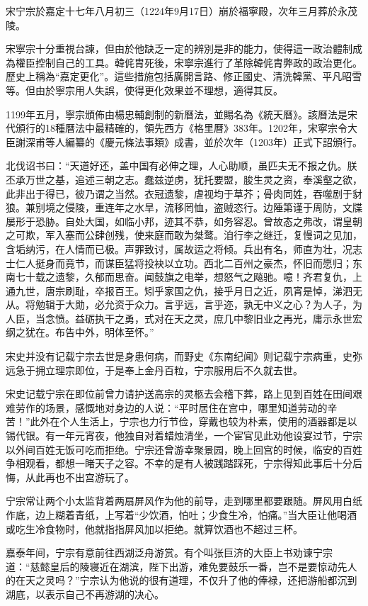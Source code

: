 宋宁宗於嘉定十七年八月初三（1224年9月17日）崩於福寧殿，次年三月葬於永茂陵。

宋寧宗十分重視台諫，但由於他缺乏一定的辨別是非的能力，使得這一政治體制成為權臣控制自己的工具。韓侂胄死後，宋寧宗進行了革除韓侂胄弊政的政治更化。歷史上稱為“嘉定更化”。這些措施包括廣開言路、修正國史、清洗韓黨、平凡昭雪等。但由於寧宗用人失誤，使得更化效果並不理想，適得其反。

1199年五月，寧宗頒佈由楊忠輔創制的新曆法，並賜名為《統天曆》。該曆法是宋代頒行的18種曆法中最精確的，領先西方《格里曆》383年。1202年，宋寧宗令大臣謝深甫等人編纂的《慶元條法事類》成書，並於次年（1203年）正式下詔頒行。

北伐诏书曰：“天道好还，盖中国有必伸之理，人心助顺，虽匹夫无不报之仇。朕丕承万世之基，追述三朝之志。蠢兹逆虏，犹托要盟，朘生灵之资，奉溪壑之欲，此非出于得已，彼乃谓之当然。衣冠遗黎，虐视均于草芥；骨肉同姓，吞噬剧于豺狼。兼别境之侵陵，重连年之水旱，流移罔恤，盗贼恣行。边陲第谨于周防，文牒屡形于恐胁。自处大国，如临小邦，迹其不恭，如务容忍。曾故态之弗改，谓皇朝之可欺，军入塞而公肆创残，使来庭而敢为桀鹜。洎行李之继迁，复慢词之见加，含垢纳污，在人情而已极。声罪致讨，属故运之将倾。兵出有名，师直为壮，况志士仁人挺身而竟节，而谋臣猛将投袂以立功。西北二百州之豪杰，怀旧而愿归；东南七十载之遗黎，久郁而思奋。闻鼓旗之电举，想怒气之飚驰。噫！齐君复仇，上通九世，唐宗刷耻，卒报百王。矧乎家国之仇，接乎月日之近，夙宵是悼，涕泗无从。将勉辑于大勋，必允资于众力。言乎远，言乎迩，孰无中义之心？为人子，为人臣，当念愤。益砺执干之勇，式对在天之灵，庶几中黎旧业之再光，庸示永世宏纲之犹在。布告中外，明体至怀。”

宋史并没有记载宁宗去世是身患何病，而野史《东南纪闻》则记载宁宗病重，史弥远急于拥立理宗即位，于是奉上金丹百粒，宁宗服用后不久就去世。

宋史记载宁宗在即位前曾力请护送高宗的灵柩去会稽下葬，路上见到百姓在田间艰难劳作的场景，感慨地对身边的人说：“平时居住在宫中，哪里知道劳动的辛苦！”此外在个人生活上，宁宗也力行节俭，穿戴也较为朴素，使用的酒器都是以锡代银。有一年元宵夜，他独自对着蜡烛清坐，一个宦官见此劝他设宴过节，宁宗以外间百姓无饭可吃而拒绝。宁宗还曾游幸聚景园，晚上回宫的时候，临安的百姓争相观看，都想一睹天子之容。不幸的是有人被践踏踩死，宁宗得知此事后十分后悔，从此再也不出宫游玩了。

宁宗常让两个小太监背着两扇屏风作为他的前导，走到哪里都要跟随。屏风用白纸作底，边上糊着青纸，上写着“少饮酒，怕吐；少食生冷，怕痛。”当大臣让他喝酒或吃生冷食物时，他就指指屏风加以拒绝。就算饮酒也不超过三杯。

嘉泰年间，宁宗有意前往西湖泛舟游赏。有个叫张巨济的大臣上书劝谏宁宗道：“慈懿皇后的陵寝近在湖滨，陛下出游，难免要鼓乐一番，岂不是要惊动先人的在天之灵吗？”宁宗认为他说的很有道理，不仅升了他的俸禄，还把游船都沉到湖底，以表示自己不再游湖的决心。

